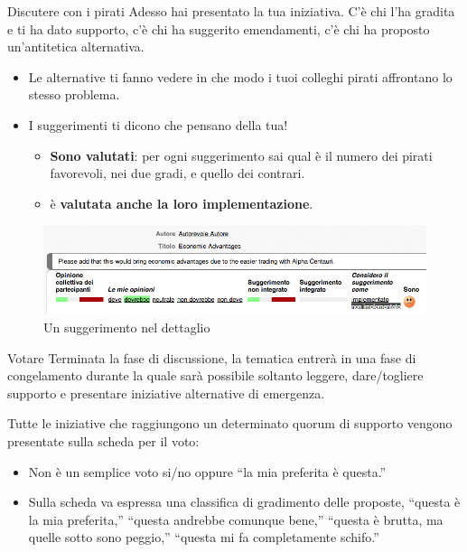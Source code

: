 \documentclass[ignorenonframetext,11pt]{beamer}\usetheme{default}
\begin{document}
\begin{frame}{Discutere con i pirati}
Adesso hai presentato la tua iniziativa. C'è chi l'ha gradita e ti ha dato supporto, c'è chi ha suggerito emendamenti, c'è chi ha proposto un'antitetica alternativa. \begin{itemize}\item Le alternative ti fanno vedere in che modo i tuoi colleghi pirati affrontano lo stesso problema. \item I suggerimenti ti dicono che pensano della tua!\begin{itemize}\item {\bfseries Sono valutati}: per ogni suggerimento sai qual è il numero dei pirati favorevoli, nei due gradi, e quello dei contrari. \item è {\bfseries valutata anche la loro implementazione}.\end{itemize}\end{itemize} \begin{figure}\includegraphics[width=\textwidth]{pics/suggerimento}
\caption{Un suggerimento nel dettaglio}
\end{figure}
\end{frame}

\begin{frame}{Votare}
Terminata la fase di discussione, la tematica entrerà in una fase di congelamento durante la quale sarà possibile soltanto leggere, dare/togliere supporto e presentare iniziative alternative di emergenza.

Tutte le iniziative che raggiungono un determinato quorum di supporto vengono presentate sulla scheda per il voto:\begin{itemize}\item Non è un semplice voto si/no oppure ``la mia preferita è questa.''\item Sulla scheda va espressa una classifica di gradimento delle proposte, ``questa è la mia preferita,'' ``questa andrebbe comunque bene,'' ``questa è brutta, ma quelle sotto sono peggio,'' ``questa mi fa completamente schifo.''\end{itemize}
\end{frame}
\end{document}
